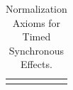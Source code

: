 \documentclass[acmsmall,review,anonymous]{acmart}\settopmatter{printfolios=true,printccs=false,printacmref=false}
\newcommand{\es}{\textcolor{black}{\ensuremath{{es}}}}
\newcommand{\choice}{\vee}
\newcommand{\code}[1]{{\tt{\ensuremath{\m{#1}}}}}
\newcommand{\empt}{\textcolor{black}{\ensuremath{\epsilon}}}
\newcommand{\bott}{\textcolor{black}{\ensuremath{\bot}}}
\newcommand{\m}{\mathit}
\begin{document}
\begin{enumerate}
% 
%  
%
%
%
%
%
%
%
%
%
% 
%
%
%
% 
% 
%
%
% 
%
%

\begin{table}[h]
\caption{Normalization Axioms for Timed Synchronous Effects.}
\label{table:normalization}
\setlength{\tabcolsep}{10pt}
\renewcommand{\arraystretch}{1.2}
\centering
\begin{tabular}{rl}
\footnotesize


\end{tabular}
\end{table}
\end{enumerate}
\end{document}
